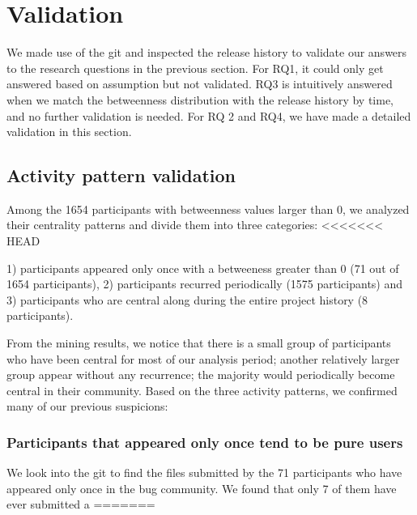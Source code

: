 \documentclass[conference]{IEEEtran}
\begin{document}

\section{Validation}
\label{validation}
We made use of the git and inspected the
release history to validate our answers to the research questions in the previous section.
For RQ1, it could only get answered based on assumption but not validated. RQ3 is intuitively answered when we match the betweenness distribution with the release history by time, and no further validation is needed. For RQ 2 and RQ4, we have made a detailed validation in this section.

\subsection{Activity pattern validation}

Among the 1654 participants with betweenness values larger than 0, we
analyzed their centrality patterns and divide them into three
categories: 
<<<<<<< HEAD

1) participants appeared only once with a betweeness greater than 0 (71 out of 1654
participants),
2) participants recurred periodically (1575 participants)
and 3) participants who are central along during the entire project
history (8 participants).


From the mining results, we notice that there is a small group of
participants who have been central for most of our analysis period; another
relatively larger group appear without any recurrence; the majority
would periodically become central in their community. Based on the
three activity patterns, we confirmed many of our previous suspicions:

\subsubsection{Participants that appeared only once tend to be pure users}

We look into the git to find the files
submitted by the 71 participants who have appeared only once in the
bug community. We found that only 7 of them have ever submitted a
=======
\end{document}
